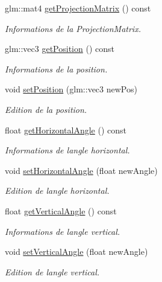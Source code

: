 \begin{DoxyCompactItemize}
glm\+::mat4 \hyperlink{classglimac_1_1Controls_a4d2d27f8aee288bac128e2965c184e3d}{get\+Projection\+Matrix} () const
\begin{DoxyCompactList}\small\item\em Informations de la Projection\+Matrix. \end{DoxyCompactList}\item 
glm\+::vec3 \hyperlink{classglimac_1_1Controls_ae6aed7f92564adca551265a404478289}{get\+Position} () const
\begin{DoxyCompactList}\small\item\em Informations de la position. \end{DoxyCompactList}\item 
void \hyperlink{classglimac_1_1Controls_a106c6381601ce5aace8ffdc0b4b7dd95}{set\+Position} (glm\+::vec3 new\+Pos)
\begin{DoxyCompactList}\small\item\em Edition de la position. \end{DoxyCompactList}\item 
float \hyperlink{classglimac_1_1Controls_a42dbb28b56c2175f7a2fe5f893c91922}{get\+Horizontal\+Angle} () const
\begin{DoxyCompactList}\small\item\em Informations de l\textquotesingle{}angle horizontal. \end{DoxyCompactList}\item 
void \hyperlink{classglimac_1_1Controls_a30b750a3e70f3a273a2abc6bc4932896}{set\+Horizontal\+Angle} (float new\+Angle)
\begin{DoxyCompactList}\small\item\em Edition de l\textquotesingle{}angle horizontal. \end{DoxyCompactList}\item 
float \hyperlink{classglimac_1_1Controls_a81093037f816103ce7d22762ac451ff4}{get\+Vertical\+Angle} () const
\begin{DoxyCompactList}\small\item\em Informations de l\textquotesingle{}angle vertical. \end{DoxyCompactList}\item 
void \hyperlink{classglimac_1_1Controls_a83626414d05716552bfe4a919ea0ff5c}{set\+Vertical\+Angle} (float new\+Angle)
\begin{DoxyCompactList}\small\item\em Edition de l\textquotesingle{}angle vertical. \end{DoxyCompactList}\item 

\end{DoxyCompactItemize}
